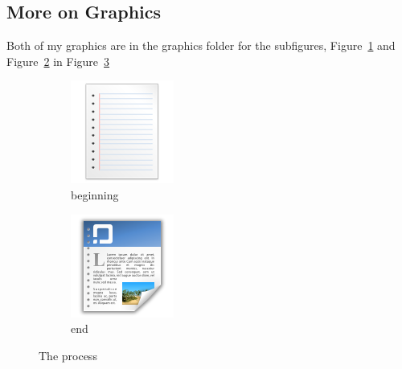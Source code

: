 \documentclass{article}
\begin{document}
        \subsection{More on Graphics}
            Both of my graphics are in the graphics folder for the subfigures, Figure~\ref{fig:paper} and Figure~\ref{fig:page} in Figure~\ref{fig:subs}\\
            \begin{figure}[htbp]
                \centering
                \begin{subfigure}[b]{0.2\textwidth}
                    \centering
                    \includegraphics[scale=0.5]{paper.png}
                    \caption{beginning}
                    \label{fig:paper}
                \end{subfigure}%
                \begin{subfigure}[b]{0.2\textwidth}
                    \centering
                    \includegraphics[scale=0.5]{page.png}
                    \caption{end}
                    \label{fig:page}
                \end{subfigure}
                \caption{The process}
                \label{fig:subs}
            \end{figure}
\end{document}
